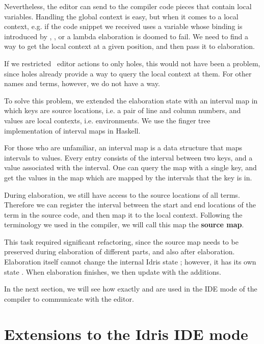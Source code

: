 Nevertheless, the editor can send to the compiler code pieces that contain local variables.
Handling the global context is easy, but when it comes to a local context, e.g. if the
code snippet we received uses a variable whose binding is introduced by
, , or a lambda elaboration is doomed to fail.
We need to find a way to get the local context at a given position, and then
pass it to elaboration.

If we restricted \Elab\ editor actions to only holes, this would not have been
a problem, since holes already provide a way to query the local context at
them. For other names and terms, however, we do not have a way.

To solve this problem, we extended the elaboration state with an interval map
in which keys are source locations, i.e. a pair of line and column numbers, and
values are local contexts, i.e. environments. We use the finger tree
implementation of interval maps in Haskell.\cite{fingertrees}

For those who are unfamiliar, an interval map is a data structure that maps
intervals to values. Every entry consists of the interval between two keys, and
a value associated with the interval. One can query the map with a single
key, and get the values in the map which are mapped by the intervals that
the key is in.

During elaboration, we still have access to the source locations of all terms.
Therefore we can register the interval between the start and end locations of
the term in the source code, and then map it to the local context.
Following the terminology we used in the compiler, we will call this map the
\textbf{source map}.

This task required significant refactoring, since the source map
needs to be preserved during elaboration of different parts, and also after
elaboration. Elaboration itself cannot change the internal Idris state
; however, it has its own state . When elaboration
finishes, we then update  with the additions.

In the next section, we will see how exactly  and 
are used in the IDE mode of the compiler to communicate with the editor.

\section{Extensions to the Idris IDE mode}\label{sec:idemode}

